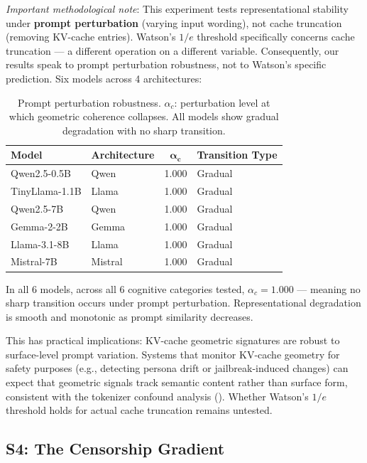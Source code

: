 \documentclass[11pt,a4paper]{article}
\begin{document}
\emph{Important methodological note}: This experiment tests representational stability under \textbf{prompt perturbation} (varying input wording), not cache truncation (removing KV-cache entries). Watson's $1/e$ threshold specifically concerns cache truncation --- a different operation on a different variable. Consequently, our results speak to prompt perturbation robustness, not to Watson's specific prediction. Six models across 4 architectures:

\begin{table}[H]
\centering
\caption{Prompt perturbation robustness. $\alpha_c$: perturbation level at which geometric coherence collapses. All models show gradual degradation with no sharp transition.}
\label{tab:rdct}
\begin{tabular}{llcl}
\toprule
\textbf{Model} & \textbf{Architecture} & $\bm{\alpha_c}$ & \textbf{Transition Type} \\
\midrule
Qwen2.5-0.5B & Qwen & 1.000 & Gradual \\
TinyLlama-1.1B & Llama & 1.000 & Gradual \\
Qwen2.5-7B & Qwen & 1.000 & Gradual \\
Gemma-2-2B & Gemma & 1.000 & Gradual \\
Llama-3.1-8B & Llama & 1.000 & Gradual \\
Mistral-7B & Mistral & 1.000 & Gradual \\
\bottomrule
\end{tabular}
\end{table}

In all 6 models, across all 6 cognitive categories tested, $\alpha_c = 1.000$ --- meaning no sharp transition occurs under prompt perturbation. Representational degradation is smooth and monotonic as prompt similarity decreases.

This has practical implications: KV-cache geometric signatures are robust to surface-level prompt variation. Systems that monitor KV-cache geometry for safety purposes (e.g., detecting persona drift or jailbreak-induced changes) can expect that geometric signals track semantic content rather than surface form, consistent with the tokenizer confound analysis (). Whether Watson's $1/e$ threshold holds for actual cache truncation remains untested.

\subsection{S4: The Censorship Gradient}
\label{sec:censorship}
\end{document}
